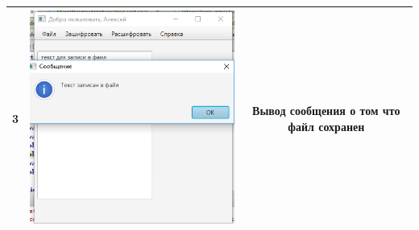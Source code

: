 \documentclass[a4paper,12pt]{article}
\begin{document}
\begin{table}[pt!]
\begin{tabular}{|c|c|c|}
	\hline 
	3 & \includegraphics[scale=0.3]{img/file/save/text_okey_save.png} & Вывод сообщения о том что файл сохранен\\
	\hline 
\end{tabular} 
\label{table:data_type3} 
\end{table}
\end{document}
